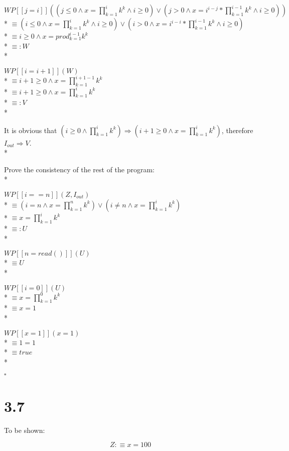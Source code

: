 \documentclass{article}
\begin{document}
$ WP[\![j=i]\!]((j\le 0 \land x=\prod_{k=1}^{i} k^k \land i \ge 0) \lor (j>0 \land x=i^{i-j}*\prod_{k=1}^{i-1} k^k \land i \ge 0)) $ \\*
$ \equiv (i\le 0 \land x=\prod_{k=1}^{i} k^k \land i \ge 0) \lor (i>0 \land x=i^{i-i}*\prod_{k=1}^{i-1} k^k \land i \ge 0) $ \\*
$ \equiv i\ge 0 \land x=prod_{k=1}^{i-1} k^k $ \\*
$ \equiv:W $ \\*

$ WP[\![i=i+1]\!](W) $ \\*
$ \equiv i+1\ge 0 \land x=\prod_{k=1}^{i+1-1} k^k $ \\*
$ \equiv i+1\ge 0 \land x=\prod_{k=1}^{i} k^k $ \\*
$ \equiv: V $ \\*

It is obvious that $ (i\ge 0 \land \prod_{k=1}^{i} k^k) \Rightarrow (i+1\ge 0 \land x=\prod_{k=1}^{i} k^k) $, therefore $ I_{out} \Rightarrow V $. \\*

Prove the consistency of the rest of the program: \\*

$ WP[\![i==n]\!](Z, I_{out}) $ \\*
$ \equiv (i=n \land x=\prod_{k=1}^{n} k^k) \lor (i\ne n \land x=\prod_{k=1}^{i} k^k) $ \\*
$ \equiv x=\prod_{k=1}^{i} k^k $ \\*
$ \equiv: U $ \\*

$ WP[\![n=read()]\!](U) $ \\*
$ \equiv U $ \\*

$ WP[\![i=0]\!](U) $ \\*
$ \equiv x=\prod_{k=1}^{0} k^k $ \\*
$ \equiv x=1 $ \\*

$ WP[\![x=1]\!](x=1) $ \\*
$ \equiv 1=1 $ \\*
$ \equiv true $ \\*

$ \square $

\section*{3.7}

To be shown:

$$ Z:\equiv x=100 $$
\end{document}
